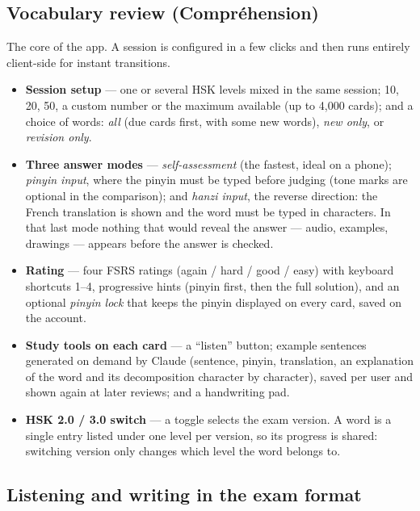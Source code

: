 \documentclass[11pt,a4paper]{article}
\begin{document}
\subsection{Vocabulary review (Compréhension)}

The core of the app. A session is configured in a few clicks and then runs
entirely client-side for instant transitions.

\begin{itemize}
  \item \textbf{Session setup} --- one or several HSK levels mixed in the same
        session; 10, 20, 50, a custom number or the maximum available (up to
        4,000 cards); and a choice of words: \emph{all} (due cards first, with
        some new words), \emph{new only}, or \emph{revision only}.
  \item \textbf{Three answer modes} --- \emph{self-assessment} (the fastest,
        ideal on a phone); \emph{pinyin input}, where the pinyin must be typed
        before judging (tone marks are optional in the comparison); and
        \emph{hanzi input}, the reverse direction: the French translation is
        shown and the word must be typed in characters. In that last mode
        nothing that would reveal the answer --- audio, examples, drawings ---
        appears before the answer is checked.
  \item \textbf{Rating} --- four FSRS ratings (again / hard / good / easy) with
        keyboard shortcuts 1--4, progressive hints (pinyin first, then the full
        solution), and an optional \emph{pinyin lock} that keeps the pinyin
        displayed on every card, saved on the account.
  \item \textbf{Study tools on each card} --- a ``listen'' button; example
        sentences generated on demand by Claude (sentence, pinyin, translation,
        an explanation of the word and its decomposition character by
        character), saved per user and shown again at later reviews; and a
        handwriting pad.
  \item \textbf{HSK 2.0 / 3.0 switch} --- a toggle selects the exam version. A
        word is a single entry listed under one level per version, so its
        progress is shared: switching version only changes which level the
        word belongs to.
\end{itemize}

\subsection{Listening and writing in the exam format}
\end{document}
